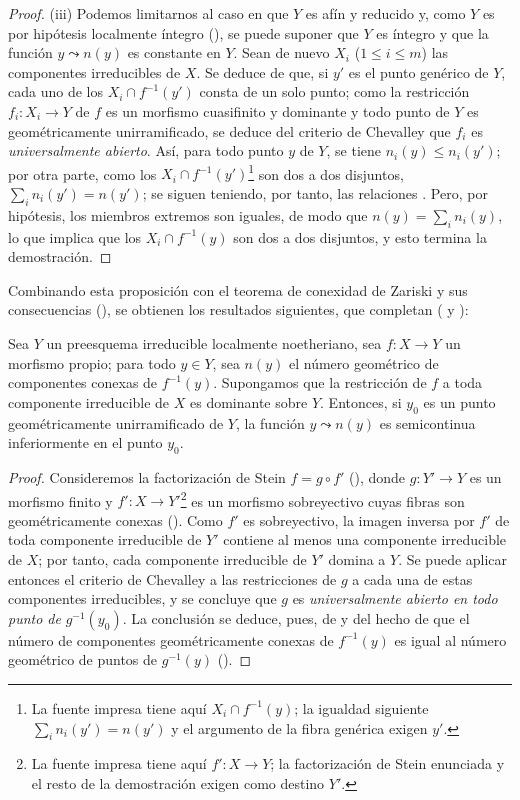 \begin{proof}
(iii)
Podemos limitarnos al caso en que $Y$ es afín y reducido y, como $Y$ es por hipótesis localmente íntegro (), se puede suponer que $Y$ es íntegro y que la función $y\leadsto n(y)$ es constante en $Y$.
Sean de nuevo $X_i$ ($1\leq i\leq m$) las componentes irreducibles de $X$.
Se deduce de  que, si $y'$ es el punto genérico de $Y$, cada uno de los $X_i\cap f^{-1}(y')$ consta de un solo punto; como la restricción $f_i:X_i\to Y$ de $f$ es un morfismo cuasifinito y dominante y todo punto de $Y$ es geométricamente unirramificado, se deduce del criterio de Chevalley  que $f_i$ es \emph{universalmente abierto}.
Así, para todo punto $y$ de $Y$, se tiene $n_i(y)\leq n_i(y')$; por otra parte, como los $X_i\cap f^{-1}(y')$\footnote{La fuente impresa tiene aquí $X_i\cap f^{-1}(y)$; la igualdad siguiente $\sum_i n_i(y')=n(y')$ y el argumento de la fibra genérica exigen $y'$.} son dos a dos disjuntos, $\sum_i n_i(y')=n(y')$; se siguen teniendo, por tanto, las relaciones .
Pero, por hipótesis, los miembros extremos son iguales, de modo que $n(y)=\sum_i n_i(y)$, lo que implica que los $X_i\cap f^{-1}(y)$ son dos a dos disjuntos, y esto termina la demostración.
\end{proof}

Combinando esta proposición con el teorema de conexidad de Zariski y sus consecuencias (), se obtienen los resultados siguientes, que completan ( y ):

\begin{proposition}[15.5.3]
\label{IV.15.5.3}
Sea $Y$ un preesquema irreducible localmente noetheriano, sea $f:X\to Y$ un morfismo propio; para todo $y\in Y$, sea $n(y)$ el número geométrico de componentes conexas  de $f^{-1}(y)$.
Supongamos que la restricción de $f$ a toda componente irreducible de $X$ es dominante sobre $Y$.
Entonces, si $y_0$ es un punto geométricamente unirramificado de $Y$, la función $y\leadsto n(y)$ es semicontinua inferiormente en el punto $y_0$.
\end{proposition}

\begin{proof}
Consideremos la factorización de Stein $f=g\circ f'$ (), donde $g:Y'\to Y$ es un morfismo finito y $f':X\to Y'$\footnote{La fuente impresa tiene aquí $f':X\to Y$; la factorización de Stein enunciada y el resto de la demostración exigen como destino $Y'$.} es un morfismo sobreyectivo cuyas fibras son geométricamente conexas ().
Como $f'$ es sobreyectivo, la imagen inversa por $f'$ de toda componente irreducible de $Y'$ contiene al menos una componente irreducible de $X$; por tanto, cada componente irreducible de $Y'$ domina a $Y$.
Se puede aplicar entonces el criterio de Chevalley  a las restricciones de $g$ a cada una de estas componentes irreducibles, y se concluye que $g$ es \emph{universalmente abierto en todo punto de} $g^{-1}(y_0)$.
La conclusión se deduce, pues, de  y del hecho de que el número de componentes geométricamente conexas de $f^{-1}(y)$ es igual al número geométrico de puntos de $g^{-1}(y)$ ().
\end{proof}

